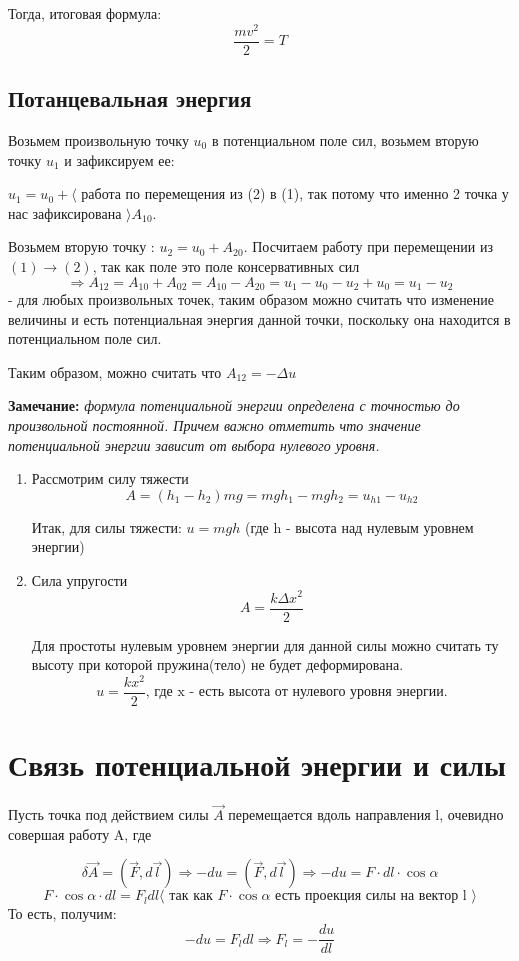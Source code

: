 \documentclass[12pt,a4paper]{report}
\begin{document}
Тогда, итоговая формула:
\[ \frac{mv^2}{2} = T \]
\subsection{Потанцевальная энергия}
Возьмем произвольную точку $u_0$ в потенциальном поле сил, возьмем вторую точку $u_1$ и зафиксируем ее:

$u_1 = u_0 + \langle$ работа по перемещения из (2) в (1), так потому что именно 2 точка у нас зафиксирована $\rangle  A_{10}$.

Возьмем вторую точку : $u_2 = u_0 + A_{20}$. Посчитаем работу при перемещении из $(1) \to (2)$, так как поле это поле консервативных сил \[ \Rightarrow A_{12} = A_{10} + A_{02} = A_{10} - A_{20} = u_1 - u_0 - u_2 + u_0 = u_1 - u_2\] - для любых произвольных точек, таким образом можно считать что изменение величины и есть потенциальная энергия данной точки, поскольку она находится в потенциальном поле сил.

Таким образом, можно считать что $A_{12} = -\Delta u $

\vspace{3px}

\textbf{Замечание:} \textit{формула потенциальной энергии определена с точностью до произвольной постоянной. Причем важно отметить что значение потенциальной энергии зависит от выбора нулевого уровня.}

\begin{enumerate}
    \item Рассмотрим силу тяжести \[ A = (h_1 - h_2)mg = mgh_1 - mgh_2 = u_{h1} - u_{h2}\]

          Итак, для силы тяжести: $u = mgh$ (где h - высота над нулевым уровнем энергии)
    \item Сила упругости \[ A = \frac{k \Delta x^2}{2}\]

          Для простоты нулевым уровнем энергии для данной силы можно считать ту высоту при которой пружина(тело) не будет деформирована.
          \[ u = \frac{kx^2}{2} \text{, где x - есть высота от нулевого уровня энергии.}\]
\end{enumerate}

\section{Связь потенциальной энергии и силы}
Пусть точка под действием силы $\vec A$ перемещается вдоль направления l, очевидно совершая работу A, где

\[ \delta \vec A = (\vec F, d \vec l) \Rightarrow -du = (\vec F, d \vec l) \Rightarrow -du = F \cdot dl \cdot \cos{\alpha} \]
\[ F \cdot \cos{\alpha} \cdot dl = F_ldl \text{$\langle$ так как $F \cdot \cos{\alpha}$ есть проекция силы на вектор l $\rangle$}\]
То есть, получим:
\[-du = F_ldl \Rightarrow F_l = -\frac{du}{dl} \]
\end{document}
